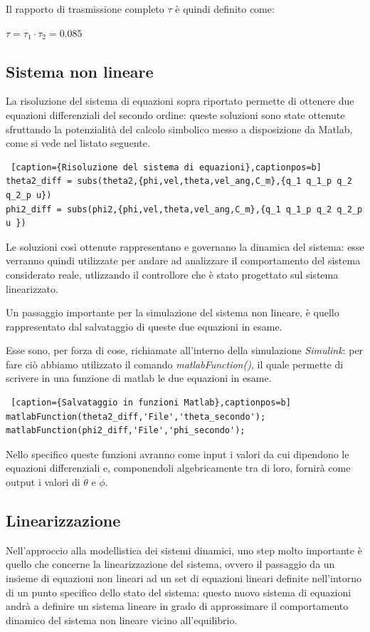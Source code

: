 Il rapporto di trasmissione completo $\tau$ è quindi definito come:
\begin{center}
	$\tau = \tau_1 \cdot{\tau_2} = 0.085$	
\end{center}

\subsection{Sistema non lineare}
La risoluzione del sistema di equazioni sopra riportato permette di ottenere due equazioni differenziali del secondo ordine: queste soluzioni sono state ottenute sfruttando la potenzialità del calcolo simbolico messo a disposizione da Matlab, come si vede nel listato seguente.

\begin{lstlisting} [caption={Risoluzione del sistema di equazioni},captionpos=b]
theta2_diff = subs(theta2,{phi,vel,theta,vel_ang,C_m},{q_1 q_1_p q_2 q_2_p u})
phi2_diff = subs(phi2,{phi,vel,theta,vel_ang,C_m},{q_1 q_1_p q_2 q_2_p u })
\end{lstlisting}

Le soluzioni così ottenute rappresentano e governano la dinamica del sistema: esse verranno quindi utilizzate per andare ad analizzare il comportamento del sistema considerato reale, utlizzando il controllore che è stato progettato sul sistema linearizzato.

Un passaggio importante per la simulazione del sistema non lineare, è quello rappresentato dal salvataggio di queste due equazioni in esame.

Esse sono, per forza di cose, richiamate all'interno della simulazione \textit{Simulink}: per fare ciò abbiamo utilizzato il comando \textit{matlabFunction()}, il quale permette di scrivere in una funzione di matlab le due equazioni in esame.

\begin{lstlisting} [caption={Salvataggio in funzioni Matlab},captionpos=b]
matlabFunction(theta2_diff,'File','theta_secondo');
matlabFunction(phi2_diff,'File','phi_secondo');
\end{lstlisting}


Nello specifico queste funzioni avranno come input i valori da cui dipendono le equazioni differenziali e, componendoli algebricamente tra di loro, fornirà come output i valori di $\ddot{\theta}$ e $\ddot{\phi}$.

\subsection{Linearizzazione}
Nell'approccio alla modellistica dei sistemi dinamici, uno step molto importante è quello che concerne la linearizzazione del sistema, ovvero il passaggio da un insieme di equazioni non lineari ad un set di equazioni lineari definite nell'intorno di un punto specifico dello stato del sistema: questo nuovo sistema di equazioni andrà a definire un sistema lineare in grado di approssimare il comportamento dinamico del sistema non lineare vicino all'equilibrio.

